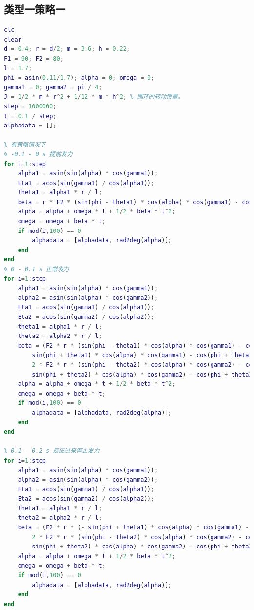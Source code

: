\documentclass{cumcm}
\begin{document}
\subsection{类型一策略一}
\begin{lstlisting}[language=matlab]
clc
clear
d = 0.4; r = d/2; m = 3.6; h = 0.22;
F1 = 90; F2 = 80;
l = 1.7;
phi = asin(0.11/1.7); alpha = 0; omega = 0;
gamma1 = 0; gamma2 = pi / 4;
J = 1/2 * m * r^2 + 1/12 * m * h^2; % 圆环的转动惯量。
step = 1000000;
t = 0.1 / step;
alphadata = [];

% 有策略情况下
% -0.1 - 0 s 提前发力
for i=1:step
    alpha1 = asin(sin(alpha) * cos(gamma1));
    Eta1 = acos(sin(gamma1) / cos(alpha1));
    theta1 = alpha1 * r / l;
    beta = r * F2 * (sin(phi - theta1) * cos(alpha) * cos(gamma1) - cos(phi - theta1) * sin(alpha1) * sin(Eta1)) / J;
    alpha = alpha + omega * t + 1/2 * beta * t^2;
    omega = omega + beta * t;
    if mod(i,100) == 0
        alphadata = [alphadata, rad2deg(alpha)];
    end
end
% 0 - 0.1 s 正常发力
for i=1:step
    alpha1 = asin(sin(alpha) * cos(gamma1));
    alpha2 = asin(sin(alpha) * cos(gamma2));
    Eta1 = acos(sin(gamma1) / cos(alpha1));
    Eta2 = acos(sin(gamma2) / cos(alpha2));
    theta1 = alpha1 * r / l;
    theta2 = alpha2 * r / l;
    beta = (F2 * r * (sin(phi - theta1) * cos(alpha) * cos(gamma1) - cos(phi - theta1) * sin(alpha1) * sin(Eta1) - ...
        sin(phi + theta1) * cos(alpha) * cos(gamma1) - cos(phi + theta1) * sin(alpha1) * sin(Eta1)) + ...
        2 * F2 * r * (sin(phi - theta2) * cos(alpha) * cos(gamma2) - cos(phi - theta2) * sin(alpha2) * sin(Eta2) - ...
        sin(phi + theta2) * cos(alpha) * cos(gamma2) - cos(phi + theta2) * sin(alpha2) * sin(Eta2))) / J;
    alpha = alpha + omega * t + 1/2 * beta * t^2;
    omega = omega + beta * t;
    if mod(i,100) == 0
        alphadata = [alphadata, rad2deg(alpha)];
    end
end

% 0.1 - 0.2 s 反应过来停止发力
for i=1:step
    alpha1 = asin(sin(alpha) * cos(gamma1));
    alpha2 = asin(sin(alpha) * cos(gamma2));
    Eta1 = acos(sin(gamma1) / cos(alpha1));
    Eta2 = acos(sin(gamma2) / cos(alpha2));
    theta1 = alpha1 * r / l;
    theta2 = alpha2 * r / l;
    beta = (F2 * r * (- sin(phi + theta1) * cos(alpha) * cos(gamma1) - cos(phi + theta1) * sin(alpha1) * sin(Eta1)) + ...
        2 * F2 * r * (sin(phi - theta2) * cos(alpha) * cos(gamma2) - cos(phi - theta2) * sin(alpha2) * sin(Eta2) - ...
        sin(phi + theta2) * cos(alpha) * cos(gamma2) - cos(phi + theta2) * sin(alpha2) * sin(Eta2))) / J;
    alpha = alpha + omega * t + 1/2 * beta * t^2;
    omega = omega + beta * t;
    if mod(i,100) == 0
        alphadata = [alphadata, rad2deg(alpha)];
    end
end


\end{lstlisting}
\end{document}
